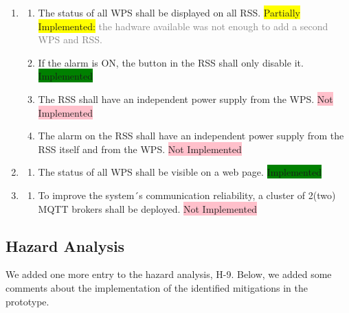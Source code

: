 \documentclass[11pt]{article}
\begin{document}
\begin{enumerate}[leftmargin=4em, font=\small, label=\textbf{SR-\arabic*}]
	\item
		\begin{enumerate}[leftmargin=1.5em, font=\small, label=\textbf{.\arabic*:}]
		\setlength\itemsep{0em}
		\item The status of all WPS shall be displayed on all RSS. \colorbox{yellow}{Partially Implemented:} \textcolor{gray}{the hadware available was not enough to add a second WPS and RSS.}
		\item If the alarm is ON, the button in the RSS shall only disable it. \colorbox{green}{Implemented}
		\item The RSS shall have an independent power supply from the WPS. \colorbox{pink}{Not Implemented}
		\item The alarm on the RSS shall have an independent power supply from the RSS itself and from the WPS. \colorbox{pink}{Not Implemented}
		\end{enumerate}
	
	\item	
		\begin{enumerate}[leftmargin=1.5em, font=\small, label=\textbf{.\arabic*:}]
		\setlength\itemsep{0em}
		\item The status of all WPS shall be visible on a web page. \colorbox{green}{Implemented}
		\end{enumerate}

	\item
		\begin{enumerate}[leftmargin=1.5em, font=\small, label=\textbf{.\arabic*:}]
		\setlength\itemsep{0em}
		\item To improve the system´s communication reliability, a cluster of 2(two) MQTT brokers shall be deployed. \colorbox{pink}{Not Implemented} 
		\end{enumerate}

\end{enumerate}

\subsection{Hazard Analysis}

We added one more entry to the hazard analysis, H-9. Below, we added some comments about the implementation of the identified mitigations in the prototype.
\end{document}
